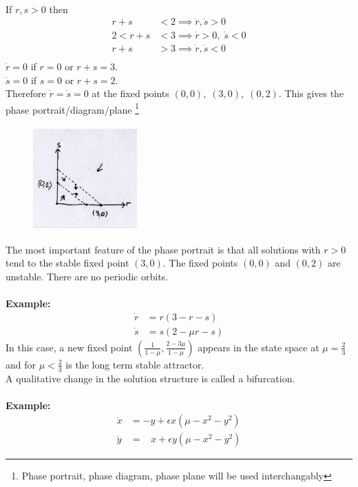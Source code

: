 \documentclass{article}
\newcommand{\example}{\textbf{Example:}}                    %
\begin{document}
\\
If $r,s >0$ then
\begin{align*}
r+s &< 2 \implies \dot{r}, \dot{s} > 0 \\
2 < r+s &< 3 \implies \dot{r} >0 , \; \dot{s} < 0 \\
r+s &> 3 \implies \dot{r}, \dot{s} < 0 \\
\end{align*}
$\dot{r} = 0$ if $r=0$ or $r+s = 3$. \\
$\dot{s} = 0$ if $s=0$ or $r+s = 2$. \\
Therefore $\dot{r} = \dot{s} = 0$ at the fixed points $(0,0), \; (3,0), \; (0,2)$.
This gives the phase portrait/diagram/plane%
\footnote{Phase portrait, phase diagram, phase plane will be used interchangably}
\begin{figure}[H]
\centering
\includegraphics[width=4cm, height=4cm]{fig0.png}
\end{figure}
\noindent
The most important feature of the phase portrait is that all solutions with 
$r >0$ tend to the stable fixed point $(3,0)$. The fixed points $(0,0)$ and
$(0,2)$ are unstable. There are no periodic orbits.
\\
\\
\example\   
\begin{align*}
\dot{r} &= r(3 - r -s) \\
\dot{s} &= s(2 - \mu r -s)
\end{align*}
In this case, a new fixed point 
$\displaystyle \left(\frac{1}{1- \mu} , \frac{2 - 3 \mu}{1- \mu} \right)$
appears in the state space at $\mu = \frac{2}{3}$ and for $\mu < \frac{2}{3}$ 
is the long term stable attractor. 
\\
A qualitative change in the solution structure is called a bifurcation.
\\
\\
\example\   
\begin{align*}
\dot{x} &= -y + \epsilon x (\mu - x^2 - y^2) \\
\dot{y} &= \;\;\; x + \epsilon y (\mu - x^2 - y^2)
\end{align*}
\end{document}
